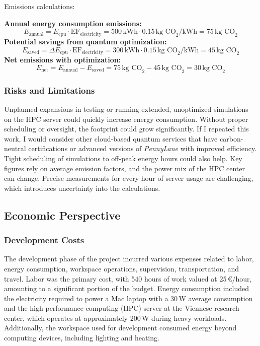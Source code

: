 Emissions calculations:
\begin{ProjectStructure}
    \textbf{Annual energy consumption emissions:}
    \[
    E_{\text{annual}} = E_{\text{cpu}} \cdot \text{EF}_{\text{electricity}} = 500 \, \text{kWh} \cdot 0.15 \, \text{kg CO}_2/\text{kWh} = 75 \, \text{kg CO}_2
    \]
    \textbf{Potential savings from quantum optimization:}
    \[
    E_{\text{saved}} = \Delta E_{\text{cpu}} \cdot \text{EF}_{\text{electricity}} = 300 \, \text{kWh} \cdot 0.15 \, \text{kg CO}_2/\text{kWh} = 45 \, \text{kg CO}_2
    \]
    \textbf{Net emissions with optimization:}
    \[
    E_{\text{net}} = E_{\text{annual}} - E_{\text{saved}} = 75 \, \text{kg CO}_2 - 45 \, \text{kg CO}_2 = 30 \, \text{kg CO}_2
    \]
\end{ProjectStructure} 
\subsubsection{Risks and Limitations}
Unplanned expansions in testing or running extended, unoptimized simulations on the HPC server could quickly increase energy consumption. Without proper scheduling or oversight, the footprint could grow significantly.
If I repeated this work, I would consider other cloud-based quantum services that have carbon-neutral certifications or advanced versions of \emph{PennyLane} with improved efficiency. Tight scheduling of simulations to off-peak energy hours could also help.
Key figures rely on average emission factors, and the power mix of the HPC center can change. Precise measurements for every hour of server usage are challenging, which introduces uncertainty into the calculations.


\subsection{Economic Perspective}

\subsubsection{Development Costs}

The development phase of the project incurred various expenses related to labor, energy consumption, workspace operations, supervision, transportation, and travel. Labor was the primary cost, with 540 hours of work valued at 25\,\euro/hour, amounting to a significant portion of the budget. Energy consumption included the electricity required to power a Mac laptop with a 30\,W average consumption and the high-performance computing (HPC) server at the Viennese research center, which operates at approximately 200\,W during heavy workloads. Additionally, the workspace used for development consumed energy beyond computing devices, including lighting and heating.

